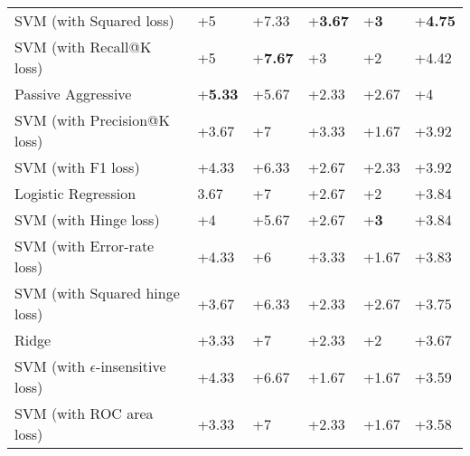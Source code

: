\begin{table}
{\begin{tabular}{@{}llllll@{}}
SVM (with Squared loss)         		& +5                       & +7.33                       & +\textbf{3.67}           & +\textbf{3}                 & +\textbf{4.75}             \\
SVM (with Recall@K loss)                  		& +5                       & +\textbf{7.67}         	 & +{3}                     & +2                          & +{4.42}    \\
Passive Aggressive                         	& +\textbf{5.33}           & +5.67             		 & +2.33                    & +2.67                       & +4                \\
SVM (with Precision@K loss)                   	& +3.67                    & +7                          & +3.33                    & +{1.67}              	  & +3.92             \\
SVM (with F1 loss)                          	& +4.33                    & +6.33                       & +2.67                    & +2.33                       & +3.92             \\
Logistic Regression                        	& 3.67                     & +7                          & +2.67                    & +2                          & +3.84             \\
SVM (with Hinge loss)                      	& +4                       & +5.67                       & +2.67                    & +\textbf{3}              	  & +3.84             \\
SVM (with Error-rate loss)                   	& +4.33                    & +6                          & +3.33                    & +1.67                       & +3.83             \\
SVM (with Squared hinge loss)                	& +3.67                    & +6.33                       & +2.33                    & +2.67                       & +3.75             \\
Ridge                                      	& +3.33                    & +7                          & +2.33                    & +2                          & +3.67             \\
SVM (with $\epsilon$-insensitive loss)       	& +4.33                    & +6.67                       & +1.67                    & +1.67                       & +3.59             \\
SVM (with ROC area loss)                    	& +3.33                    & +7                          & +2.33                    & +1.67                       & +3.58             \\

\end{tabular}}
\end{table}
